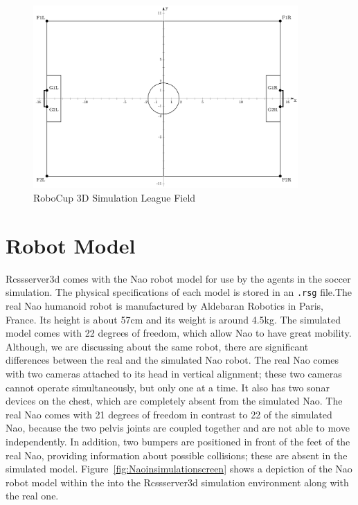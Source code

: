 \begin{figure}[t!]
\centering
  \includegraphics[width=0.9\textwidth]{Chapter2/figures/SoccerSimulation_FieldPlan.png}
  \caption{RoboCup 3D Simulation League Field} 
  \label{fig:SimulationSoccerField}
\end{figure}


\section{Robot Model}
Rcssserver3d comes with the Nao robot model for use by the agents in the soccer simulation. The physical specifications of each model is stored in an \texttt{.rsg} file.The real Nao humanoid robot is manufactured by Aldebaran Robotics in Paris, France. Its height is about 57cm and its weight is around 4.5kg. The simulated model comes with 22 degrees of freedom, which allow Nao to have great mobility. Although, we are discussing about the same robot, there are significant differences between the real and the simulated Nao robot. The real Nao comes with two cameras attached to its head in vertical alignment; these two cameras cannot operate simultaneously, but only one at a time. It also has two sonar devices on the chest, which are completely absent from the simulated Nao. The real Nao comes with 21 degrees of freedom in contrast to 22 of the simulated Nao, because the two pelvis joints are coupled together and are not able to move independently. In addition, two bumpers are positioned in front of the feet of the real Nao, providing information about possible collisions; these are absent in the simulated model. Figure~\ref{fig:Naoinsimulationscreen} shows a depiction of the Nao robot model within the into the Rcssserver3d simulation environment along with the real one.

